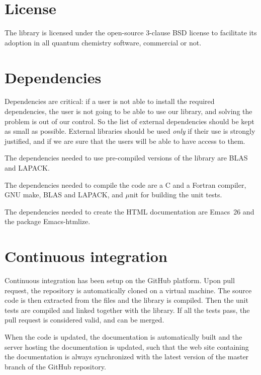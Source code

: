 \section{License}

The library is licensed under the open-source 3-clause BSD license to facilitate
its adoption in all quantum chemistry software, commercial or not.

\section{Dependencies}

Dependencies are critical: if a user is not able to install the
required dependencies, the user is not going to be able to use our
library, and solving the problem is out of our control. So the list of
external dependencies should be kept as small as possible. 
External libraries should be used \emph{only} if their use is
strongly justified, and if we are sure that the users will be able to
have access to them.

The dependencies needed to use pre-compiled versions of the library
are \ac{BLAS} and \ac{LAPACK}.

The dependencies needed to compile the code are
a C and a Fortran compiler, GNU make, \ac{BLAS} and \ac{LAPACK}, and
$\mu$nit\cite{munit} for building the unit tests.

The dependencies needed to create the \ac{HTML} documentation are
Emacs~26 and the package Emacs-htmlize.


\section{Continuous integration}

Continuous integration has been setup on the GitHub platform. Upon
pull request, the repository is automatically cloned on a virtual
machine. The source code is then extracted from the {\orgmode}
files and the library is compiled. Then the unit tests are compiled
and linked together with the library. If all the tests pass, the
pull request is considered valid, and can be merged.

When the code is updated, the documentation is automatically built and
the server hosting the documentation is updated, such that the web
site containing the documentation is always synchronized with the
latest version of the master branch of the GitHub repository.
